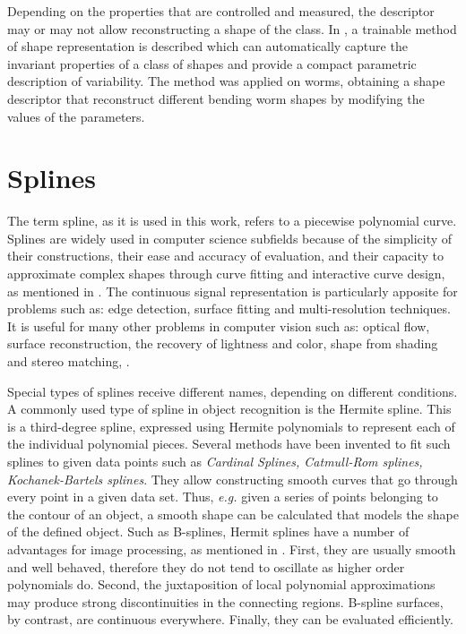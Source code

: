 Depending on the properties that are controlled and measured, the descriptor
may or may not allow reconstructing a shape of the class. In \cite{wormparam}, 
a trainable method of shape representation is described which can
automatically capture the invariant properties of a class of shapes and 
provide a compact parametric description of variability. The method was
applied on worms, obtaining a shape descriptor that reconstruct different
bending worm shapes by modifying the values of the parameters.\\

\section{Splines}
\label{sec:splines}

The term spline, as it is used in this work, refers to a piecewise polynomial curve. Splines
are widely used in computer science subfields because of the simplicity of their constructions,
their ease and accuracy of evaluation, and their capacity to approximate complex shapes
through curve fitting and interactive curve design, as mentioned in \cite{web:splines}.
The continuous signal representation is particularly apposite for 
problems such as: edge detection, surface fitting and multi-resolution
techniques. It is useful for many other problems in computer
vision such as: optical flow, surface reconstruction, the recovery
of lightness and color, shape from shading and stereo matching,
\cite[821]{splinespap}.

Special types of splines receive different names, depending on different conditions.\\
A commonly used type of spline in object recognition is the Hermite spline. This is a third-degree spline, expressed using Hermite polynomials to represent each of the 
individual polynomial pieces. 
Several methods have been invented to fit such splines to given data points such
as \emph{Cardinal Splines, Catmull-Rom splines, Kochanek-Bartels splines}. They allow constructing smooth curves that go through every point in a given data set. Thus, \emph{e.g.} 
given a series of points belonging to the contour of an object, a smooth shape can be 
calculated that models the shape of the defined object.  
Such as B-splines, Hermit splines have a number of advantages for image processing, as
mentioned in \cite{splinespap}.
First, they are usually smooth and well behaved, therefore they do not tend to oscillate
as higher order polynomials do. Second, the juxtaposition of local polynomial approximations
may produce strong discontinuities in the connecting regions. B-spline
surfaces, by contrast, are continuous everywhere. 
Finally, they can be evaluated efficiently.
